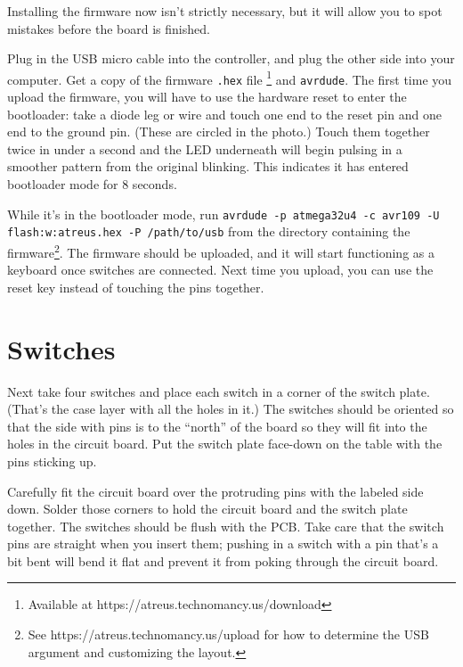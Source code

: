 \documentclass[landscape,twocolumn]{article}
\begin{document}
Installing the firmware now isn't strictly necessary, but it will
allow you to spot mistakes before the board is finished.

\vspace{1em}

Plug in the USB micro cable into the controller, and plug the other
side into your computer. Get a copy of the
firmware \texttt{.hex} file \footnote{Available at
  https://atreus.technomancy.us/download} and \texttt{avrdude}. The
first time you upload the firmware, you will have to use the hardware
reset to enter the bootloader: take a diode leg or wire and touch one
end to the reset pin and one end to the ground pin. (These are circled
in the photo.)  Touch them together twice in under a second and the
LED underneath will begin pulsing in a smoother pattern from the
original blinking. This indicates it has entered bootloader mode for 8
seconds.

\vspace{1em}

While it's in the bootloader mode, run \texttt{avrdude -p atmega32u4
  -c avr109 -U flash:w:atreus.hex -P /path/to/usb} from the directory
containing the firmware\footnote{See
  https://atreus.technomancy.us/upload for how to determine the USB
  argument and customizing the layout.}. The firmware should be
uploaded, and it will start functioning as a keyboard once switches
are connected. Next time you upload, you can use the reset key instead
of touching the pins together.

\section{Switches}

Next take four switches and place each switch in a corner of the
switch plate. (That's the case layer with all the holes in it.) The
switches should be oriented so that the side with pins is to the
``north'' of the board so they will fit into the holes in the circuit
board. Put the switch plate face-down on the table with the pins
sticking up.

\vspace{1em}

Carefully fit the circuit board over the protruding pins with the
labeled side down. Solder those corners to hold the circuit board and
the switch plate together. The switches should be flush with the
PCB. Take care that the switch pins are straight when you insert them;
pushing in a switch with a pin that's a bit bent will bend it flat and
prevent it from poking through the circuit board.
\end{document}
